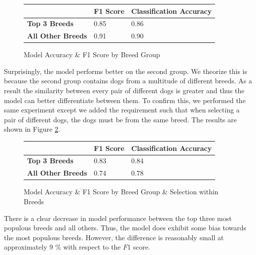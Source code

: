 \documentclass{article}
\begin{document}
\begin{figure}[]

\begin{center}

\begin{tabular}{|l|l|l|}
\hline
                          & \textbf{F1 Score} & \textbf{Classification Accuracy} \\ \hline
\textbf{Top 3 Breeds}     & 0.85        & 0.86              \\ \hline
\textbf{All Other Breeds} & 0.91        & 0.90              \\ \hline
\end{tabular}
\end{center}


\caption{Model Accuracy \& F1 Score by Breed Group}
\label{fig:x breed score}
\end{figure}

\noindent Surprisingly, the model performs better on the second group.  We theorize this is because the second group contains dogs from a multitude of different breeds.   As a result the similarity between every pair of different dogs is greater and thus the model can better differentiate between them.  To confirm this, we performed the same experiment except we added the requirement such that when selecting a pair of different dogs, the dogs must be from the same breed.  The results are shown in Figure \ref{fig:x breed score in breed}.

\begin{figure}[]

\begin{center}

\begin{tabular}{|l|l|l|}
\hline
                          & \textbf{F1 Score} & \textbf{Classification Accuracy} \\ \hline
\textbf{Top 3 Breeds}     & 0.83        & 0.84              \\ \hline
\textbf{All Other Breeds} & 0.74        & 0.78              \\ \hline
\end{tabular}
\end{center}
\caption{Model Accuracy \& F1 Score by Breed Group & Selection within Breeds}
\label{fig:x breed score in breed}
\end{figure}

\noident  There is a clear decrease in model performance between the top three most populous breeds and all others.  Thus, the model does exhibit some bias towards the most populous breeds.  However, the difference is reasonably small at approximately 9 \% with respect to the $F1$ score.
\end{document}
